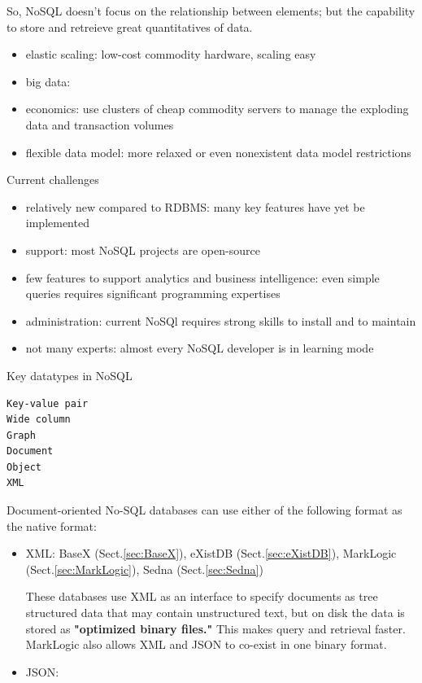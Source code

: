 So, NoSQL doesn't focus on the relationship between elements; but the capability
to store and retreieve great quantitatives of data. 
\begin{itemize}
  \item elastic scaling: low-cost commodity hardware, scaling easy
  \item big data:
  \item economics: use clusters of cheap commodity servers to manage the
  exploding data and transaction volumes
  \item flexible data model: more relaxed or even nonexistent data model
  restrictions
\end{itemize}


Current challenges
\begin{itemize}
  \item relatively new compared to RDBMS: many key features have yet be
  implemented
  \item support: most NoSQL projects are open-source
  \item few features to support analytics and business intelligence: even simple
  queries requires significant programming expertises
  \item administration: current NoSQl requires strong skills to install and to
  maintain
  \item not many experts: almost every NoSQL developer is in learning mode
\end{itemize}

Key datatypes in NoSQL
\begin{verbatim}
Key-value pair
Wide column
Graph
Document
Object
XML
\end{verbatim}

Document-oriented No-SQL databases can use either of the following format as
the native format:
\begin{itemize}
  \item XML: BaseX (Sect.\ref{sec:BaseX}), eXistDB (Sect.\ref{sec:eXistDB}),
  MarkLogic (Sect.\ref{sec:MarkLogic}), Sedna (Sect.\ref{sec:Sedna})
  
 These databases use XML as an interface to specify documents as tree structured
 data that may contain unstructured text, but on disk the data is stored as
 {\bf "optimized binary files."} This makes query and retrieval faster.
MarkLogic also allows XML and JSON to co-exist in one binary format.  
  
  \item JSON: 
\end{itemize}

